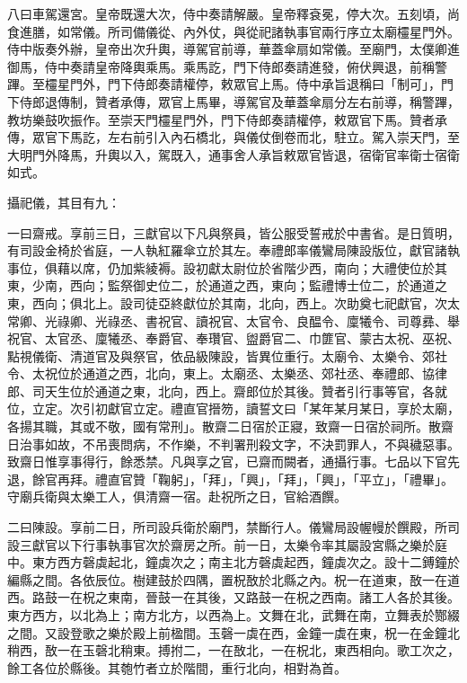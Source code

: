 \begin{pinyinscope}
 八曰車駕還宮。皇帝既還大次，侍中奏請解嚴。皇帝釋袞冕，停大次。五刻頃，尚食進膳，如常儀。所司備儀從、內外仗，與從祀諸執事官兩行序立太廟欞星門外。侍中版奏外辦，皇帝出次升輿，導駕官前導，華蓋傘扇如常儀。至廟門，太僕卿進御馬，侍中奏請皇帝降輿乘馬。乘馬訖，門下侍郎奏請進發，俯伏興退，前稱警蹕。至欞星門外，門下侍郎奏請權停，敕眾官上馬。侍中承旨退稱曰「制可」，門下侍郎退傳制，贊者承傳，眾官上馬畢，導駕官及華蓋傘扇分左右前導，稱警蹕，教坊樂鼓吹振作。至崇天門欞星門外，門下侍郎奏請權停，敕眾官下馬。贊者承傳，眾官下馬訖，左右前引入內石橋北，與儀仗倒卷而北，駐立。駕入崇天門，至大明門外降馬，升輿以入，駕既入，通事舍人承旨敕眾官皆退，宿衛官率衛士宿衛如式。



 攝祀儀，其目有九：



 一曰齋戒。享前三日，三獻官以下凡與祭員，皆公服受誓戒於中書省。是日質明，有司設金椅於省庭，一人執紅羅傘立於其左。奉禮郎率儀鸞局陳設版位，獻官諸執事位，俱藉以席，仍加紫綾褥。設初獻太尉位於省階少西，南向；大禮使位於其東，少南，西向；監祭御史位二，於通道之西，東向；監禮博士位二，於通道之東，西向；俱北上。設司徒亞終獻位於其南，北向，西上。次助奠七祀獻官，次太常卿、光祿卿、光祿丞、書祝官、讀祝官、太官令、良醖令、廩犧令、司尊彞、舉祝官、太官丞、廩犧丞、奉爵官、奉瓚官、盥爵官二、巾篚官、蒙古太祝、巫祝、點視儀衛、清道官及與祭官，依品級陳設，皆異位重行。太廟令、太樂令、郊社令、太祝位於通道之西，北向，東上。太廟丞、太樂丞、郊社丞、奉禮郎、協律郎、司天生位於通道之東，北向，西上。齋郎位於其後。贊者引行事等官，各就位，立定。次引初獻官立定。禮直官搢笏，讀誓文曰「某年某月某日，享於太廟，各揚其職，其或不敬，國有常刑」。散齋二日宿於正寢，致齋一日宿於祠所。散齋日治事如故，不吊喪問病，不作樂，不判署刑殺文字，不決罰罪人，不與穢惡事。致齋日惟享事得行，餘悉禁。凡與享之官，已齋而闕者，通攝行事。七品以下官先退，餘官再拜。禮直官贊「鞠躬」，「拜」，「興」，「拜」，「興」，「平立」，「禮畢」。守廟兵衛與太樂工人，俱清齋一宿。赴祝所之日，官給酒饌。



 二曰陳設。享前二日，所司設兵衛於廟門，禁斷行人。儀鸞局設幄幔於饌殿，所司設三獻官以下行事執事官次於齋房之所。前一日，太樂令率其屬設宮縣之樂於庭中。東方西方磬虡起北，鐘虡次之；南主北方磬虡起西，鐘虡次之。設十二鎛鐘於編縣之間。各依辰位。樹建鼓於四隅，置柷敔於北縣之內。柷一在道東，敔一在道西。路鼓一在柷之東南，晉鼓一在其後，又路鼓一在柷之西南。諸工人各於其後。東方西方，以北為上；南方北方，以西為上。文舞在北，武舞在南，立舞表於酂綴之間。又設登歌之樂於殿上前楹間。玉磬一虡在西，金鐘一虡在東，柷一在金鐘北稍西，敔一在玉磬北稍東。搏拊二，一在敔北，一在柷北，東西相向。歌工次之，餘工各位於縣後。其匏竹者立於階間，重行北向，相對為首。




\end{pinyinscope}
